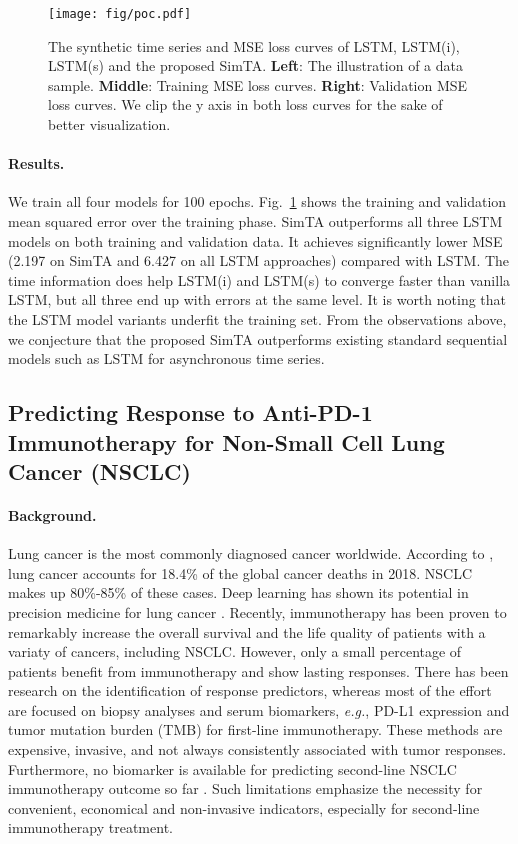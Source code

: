 \documentclass[runningheads]{llncs}
\newcommand{\eg}{\textit{e.g.}}
\begin{document}
	\begin{figure}[tb]
	\texttt{[image: fig/poc.pdf]}
	\caption{The synthetic time series and MSE loss curves of LSTM, LSTM(i), LSTM(s) and the proposed SimTA. \textbf{Left}: The illustration of a data sample. \textbf{Middle}: Training MSE loss curves. \textbf{Right}: Validation MSE loss curves. We clip the y axis in both loss curves for the sake of better visualization.} \label{fig:poc}

	\end{figure}

	\paragraph{\textbf{Results.}}
	We train all four models for 100 epochs. Fig.~\ref{fig:poc} shows the training and validation mean squared error over the training phase. SimTA outperforms all three LSTM models on both training and validation data. It achieves significantly lower MSE (2.197 on SimTA and 6.427 on all LSTM approaches) compared with LSTM. The time information does help LSTM(i) and LSTM(s) to converge faster than vanilla LSTM, but all three end up with errors at the same level. It is worth noting that the LSTM model variants underfit the training set. From the observations above, we conjecture that the proposed SimTA outperforms existing standard sequential models such as LSTM for asynchronous time series.

\subsection{Predicting Response to Anti-PD-1 Immunotherapy for Non-Small Cell Lung Cancer (NSCLC)}

	\paragraph{\textbf{Background.}}

	Lung cancer is the most commonly diagnosed cancer worldwide. According to \cite{Bray2018GlobalCS}, lung cancer accounts for 18.4\% of the global cancer deaths in 2018. NSCLC makes up 80\%-85\% of these cases. Deep learning has shown its potential in precision medicine for lung cancer \cite{zhao20183d,zhao2019toward,yang2019development,yang2020relational}. Recently, immunotherapy has been proven to remarkably increase the overall survival and the life quality of patients with a variaty of cancers, including NSCLC. However, only a small percentage of patients benefit from immunotherapy and show lasting responses. There has been research on the identification of response predictors, whereas most of the effort are focused on biopsy analyses and serum biomarkers, \eg, PD-L1 expression and tumor mutation burden (TMB) for first-line immunotherapy. These methods are expensive, invasive, and not always consistently associated with tumor responses. Furthermore, no biomarker is available for predicting second-line NSCLC immunotherapy outcome so far . Such limitations emphasize the necessity for convenient, economical and non-invasive indicators, especially for second-line immunotherapy treatment.
\end{document}
